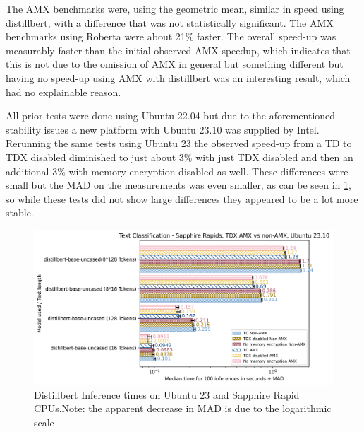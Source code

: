 The AMX benchmarks were, using the geometric mean, similar in speed using distillbert, with a difference that was not statistically significant. The AMX benchmarks using Roberta were about 21\% faster. The overall speed-up was measurably faster than the initial observed AMX speedup, which indicates that this is not due to the omission of AMX in general but something different but having no speed-up using AMX with distillbert was an interesting result, which had no explainable reason. 


All prior tests were done using Ubuntu 22.04 but due to the aforementioned stability issues a new platform with Ubuntu 23.10 was supplied by Intel. Rerunning the same tests using Ubuntu 23 the observed speed-up from a TD to TDX disabled diminished to just about 3\% with just TDX disabled and then an additional 3\% with memory-encryption disabled as well. These differences were small but the MAD on the measurements was even smaller, as can be seen in  \cref{fig:distillbertAMXUbuntu23}, so while these tests did not show large differences they appeared to be a lot more stable. 
\begin{figure}
   \centering
       \includegraphics[width=.95\textwidth]{figures/inferencedistillbertMADUbuntu23AMX.png} 
 \caption{Distillbert Inference times on Ubuntu 23 and Sapphire Rapid CPUs.Note: the apparent decrease in MAD is due to the logarithmic scale}
 \label{fig:distillbertAMXUbuntu23}
\end{figure}

